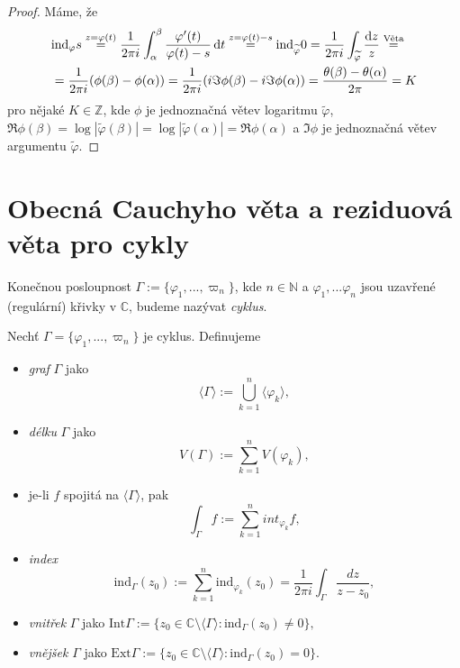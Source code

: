 \begin{proof}
Máme, že
\begin{equation*}
\begin{aligned}
&\text{ind}_\varphi s\stackrel{z=\varphi(t)}{=}\frac{1}{2 \pi i}\int_\alpha^\beta \frac{\varphi'(t)}{\varphi(t)-s} \mathop{}\!\mathrm{d} t \stackrel{z=\varphi(t)-s}{=} \text{ind}_{\widetilde{\varphi}}0=\frac{1}{2 \pi i} \int_{\widetilde{\varphi}} \frac{\mathop{}\!\mathrm{d} z}{z}\stackrel{\text{Věta}}{=}\\ &=  \frac{1}{2 \pi i}(\phi(\beta)-\phi(\alpha))=\frac{1}{2 \pi i}(i \Im \phi(\beta)-i \Im \phi(\alpha))=\frac{\theta(\beta)-\theta(\alpha)}{2 \pi}=K
\end{aligned}
\end{equation*}
pro nějaké $K \in \mathbb{Z}$, kde $\phi$ je jednoznačná větev logaritmu $\widetilde{\varphi}$, $\Re \phi (\beta)=\log |\widetilde{\varphi}(\beta)|=\log |\widetilde{\varphi}(\alpha)|=\Re \phi (\alpha)$ a $\Im \phi$ je jednoznačná větev argumentu $\widetilde{\varphi}$.
\end{proof}

\section{Obecná Cauchyho věta a reziduová věta pro cykly}

\begin{definition}
Konečnou posloupnost $\Gamma:=\{\varphi_1, ... ,\varpi_n\}$, kde $n\in\mathbb{N}$ a $\varphi_1, ... \varphi_n$ jsou uzavřené (regulární) křivky v $\mathbb{C}$, budeme nazývat \emph{cyklus}.
\end{definition}

\begin{notation}
Nechť $\Gamma = \{\varphi_1, ... ,\varpi_n\}$ je cyklus. Definujeme
\begin{itemize}
    \item \emph{graf} $\Gamma$ jako $$\langle\Gamma\rangle:=\bigcup_{k=1}^n \langle\varphi_k\rangle,$$
    \item \emph{délku} $\Gamma$ jako $$V\left(\Gamma\right):=\sum_{k=1}^n V(\varphi_k),$$ 
    \item je-li $f$ spojitá na $\langle\Gamma\rangle$, pak $$\int_\Gamma f := \sum_{k=1}^n int_{\varphi_k}f,$$
    \item \emph{index} $$\text{ind}_\Gamma(z_0):=\sum_{k=1}^n \text{ind}_{\varphi_k}(z_0) = \frac{1}{2\pi i}\int_\Gamma \frac{dz}{z-z_0},$$
    \item \emph{vnitřek} $\Gamma$ jako $\text{Int}\Gamma:=\{z_0\in\mathbb{C}\setminus\langle\Gamma\rangle: \text{ind}_\Gamma(z_0)\neq 0\},$
    \item \emph{vnějšek} $\Gamma$ jako $\text{Ext} \Gamma:=\{z_0\in\mathbb{C}\setminus\langle\Gamma\rangle: \text{ind}_\Gamma(z_0)=0\}.$
\end{itemize}
\end{notation}

